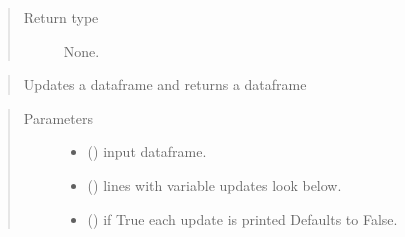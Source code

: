 \documentclass[letterpaper,10pt,english]{sphinxmanual}
\begin{document}
\begin{fulllineitems}
\begin{fulllineitems}
\begin{quote}
\begin{description}
\begin{itemize}
\end{itemize}

\item[{Return type}] \leavevmode
\sphinxAtStartPar
None.

\end{description}\end{quote}

\end{fulllineitems}


\begin{fulllineitems}
\label{\detokenize{index:modelclass.Model_help_Mixin.update_old}}
\pysigstartsignatures
{}
\pysigstopsignatures\begin{quote}

\sphinxAtStartPar
Updates a dataframe and returns a dataframe
\end{quote}
\begin{quote}\begin{description}
\item[{Parameters}] \leavevmode\begin{itemize}
\item {} 
\sphinxAtStartPar
{} () \textendash{} input dataframe.

\item {} 
\sphinxAtStartPar
{} () \textendash{} lines with variable updates look below.

\item {} 
\sphinxAtStartPar
{} (\sphinxstyleliteralemphasis{\sphinxupquote{, }}) \textendash{} if True each update is printed  Defaults to False.


\end{itemize}
\end{description}
\end{quote}
\end{fulllineitems}
\end{fulllineitems}
\end{document}
